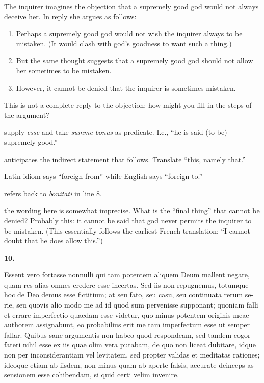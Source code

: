  The inquirer imagines the objection that a supremely good god would not always deceive her. In reply she argues as follows:

\begin{enumerate}
    \item Perhaps a supremely good god would not wish the inquirer always to be mistaken. (It would clash with god's goodness to want such a thing.)
    \item But the same thought suggests that a supremely good god should not allow her sometimes to be mistaken.
    \item However, it cannot be denied that the inquirer is sometimes mistaken.
\end{enumerate}

This is not a complete reply to the objection: how might you fill in the steps of the argument?

 supply \textit{esse} and take \textit{summe bonus} as predicate. I.e., ``he is said (to be) supremely good.''

 anticipates the indirect statement that follows. Translate ``this, namely that.''

 Latin idiom says ``foreign from'' while English says ``foreign to.''

 refers back to \textit{bonitati} in line 8.

 the wording here is somewhat imprecise. What is the ``final thing'' that cannot be denied? Probably this: it cannot be said that god never permits the inquirer to be mistaken. (This essentially follows the earliest French translation: ``I cannot doubt that he does allow this.'')

\clearpage

\beginnumbering
\pstart
\textbf{10.} \begin{latin}Essent vero fortasse nonnulli qui tam potentem aliquem Deum mallent negare, quam res alias omnes credere esse incertas. Sed iis non repugnemus, totumque hoc de Deo demus esse fictitium; at seu fato, seu casu, seu continuata rerum serie, seu quovis alio modo me ad id quod sum pervenisse supponant; quoniam falli et errare imperfectio quaedam esse videtur, quo minus potentem originis meae authorem assignabunt, eo probabilius erit me tam imperfectum esse ut semper fallar. Quibus sane argumentis non habeo quod respondeam, sed tandem cogor fateri nihil esse ex iis quae olim vera putabam, de quo non liceat dubitare, idque non per inconsiderantiam vel levitatem, sed propter validas et meditatas rationes; ideoque etiam ab iisdem, non minus quam ab aperte falsis, accurate deinceps assensionem esse cohibendam, si quid certi velim invenire.\end{latin}
\pend
\endnumbering

